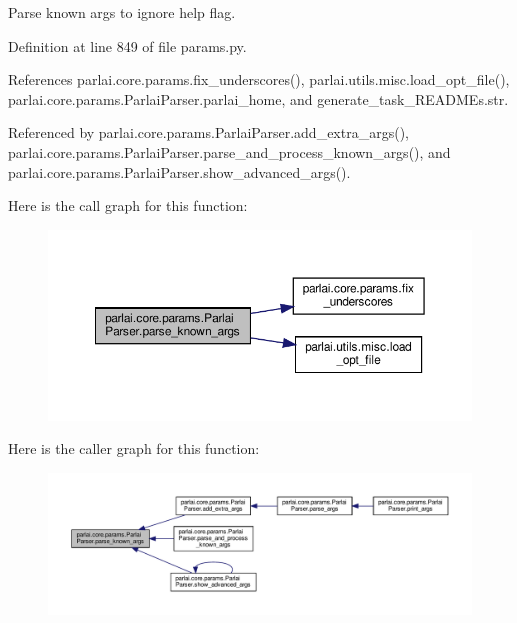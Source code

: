 \begin{DoxyVerb}Parse known args to ignore help flag.\end{DoxyVerb}
 

Definition at line 849 of file params.\+py.



References parlai.\+core.\+params.\+fix\+\_\+underscores(), parlai.\+utils.\+misc.\+load\+\_\+opt\+\_\+file(), parlai.\+core.\+params.\+Parlai\+Parser.\+parlai\+\_\+home, and generate\+\_\+task\+\_\+\+R\+E\+A\+D\+M\+Es.\+str.



Referenced by parlai.\+core.\+params.\+Parlai\+Parser.\+add\+\_\+extra\+\_\+args(), parlai.\+core.\+params.\+Parlai\+Parser.\+parse\+\_\+and\+\_\+process\+\_\+known\+\_\+args(), and parlai.\+core.\+params.\+Parlai\+Parser.\+show\+\_\+advanced\+\_\+args().

Here is the call graph for this function\+:
\nopagebreak
\begin{figure}[H]
\begin{center}
\leavevmode
\includegraphics[width=350pt]{classparlai_1_1core_1_1params_1_1ParlaiParser_a2a98c07f7393108ad67773951038f191_cgraph}
\end{center}
\end{figure}
Here is the caller graph for this function\+:
\nopagebreak
\begin{figure}[H]
\begin{center}
\leavevmode
\includegraphics[width=350pt]{classparlai_1_1core_1_1params_1_1ParlaiParser_a2a98c07f7393108ad67773951038f191_icgraph}
\end{center}
\end{figure}
\mbox{\label{classparlai_1_1core_1_1params_1_1ParlaiParser_adb1dec3d3433b40209bb2c24722df335}} 
